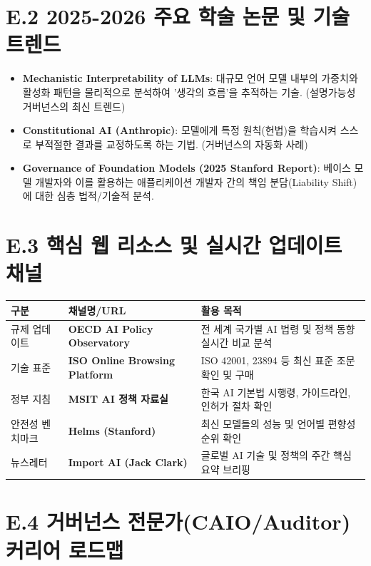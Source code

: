 \section*{E.2 2025-2026 주요 학술 논문 및 기술 트렌드}

\begin{itemize}
    \item \textbf{Mechanistic Interpretability of LLMs}: 대규모 언어 모델 내부의 가중치와 활성화 패턴을 물리적으로 분석하여 '생각의 흐름'을 추적하는 기술. (설명가능성 거버넌스의 최신 트렌드)
    \item \textbf{Constitutional AI (Anthropic)}: 모델에게 특정 원칙(헌법)을 학습시켜 스스로 부적절한 결과를 교정하도록 하는 기법. (거버넌스의 자동화 사례)
    \item \textbf{Governance of Foundation Models (2025 Stanford Report)}: 베이스 모델 개발자와 이를 활용하는 애플리케이션 개발자 간의 책임 분담(Liability Shift)에 대한 심층 법적/기술적 분석.
\end{itemize}

\section*{E.3 핵심 웹 리소스 및 실시간 업데이트 채널}

\begin{center}
\begin{tabularx}{\textwidth}{|p{3cm}|p{4cm}|X|}
\hline
\textbf{구분} & \textbf{채널명/URL} & \textbf{활용 목적} \\ \hline
규제 업데이트 & \textbf{OECD AI Policy Observatory} & 전 세계 국가별 AI 법령 및 정책 동향 실시간 비교 분석 \\ \hline
기술 표준 & \textbf{ISO Online Browsing Platform} & ISO 42001, 23894 등 최신 표준 조문 확인 및 구매 \\ \hline
정부 지침 & \textbf{MSIT AI 정책 자료실} & 한국 AI 기본법 시행령, 가이드라인, 인허가 절차 확인 \\ \hline
안전성 벤치마크 & \textbf{Helms (Stanford)} & 최신 모델들의 성능 및 언어별 편향성 순위 확인 \\ \hline
뉴스레터 & \textbf{Import AI (Jack Clark)} & 글로벌 AI 기술 및 정책의 주간 핵심 요약 브리핑 \\ \hline
\end{tabularx}
\end{center}

\section*{E.4 거버넌스 전문가(CAIO/Auditor) 커리어 로드맵}

